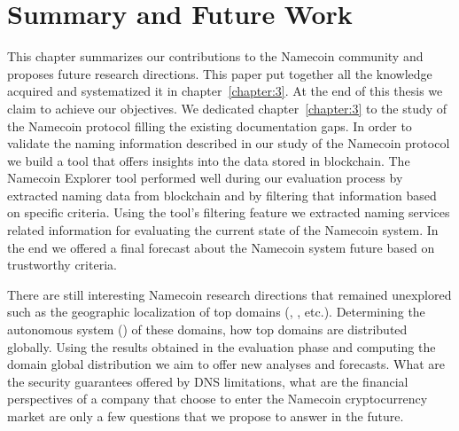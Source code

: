 \chapter{Summary and Future Work}
\label{chapter:7}

This chapter summarizes our contributions to the Namecoin community and proposes future research directions. This paper put together all the knowledge acquired and systematized it in chapter~\ref{chapter:3}. 
At the end of this thesis we claim to achieve our objectives. We dedicated chapter~\ref{chapter:3} to the study of the Namecoin protocol filling the existing documentation gaps. In order to validate the naming information described in our study of the Namecoin protocol we build a tool that offers insights into the data stored in blockchain. The Namecoin Explorer tool performed well during our evaluation process by extracted naming data from blockchain and by filtering that information based on specific criteria. Using the tool's filtering feature we extracted naming services related information for evaluating the current state of the Namecoin system. In the end we offered a final forecast about the Namecoin system future based on trustworthy criteria.

There are still interesting Namecoin research directions that remained unexplored such as the geographic localization of top  domains (, , etc.). Determining the autonomous system () of these domains, how top domains are distributed globally.
Using the results obtained in the evaluation phase and computing the  domain global distribution we aim to offer new analyses and forecasts. What are the security guarantees offered by DNS limitations, what are the financial perspectives of a company that choose to enter the Namecoin cryptocurrency market are only a few questions that we propose to answer in the future.


